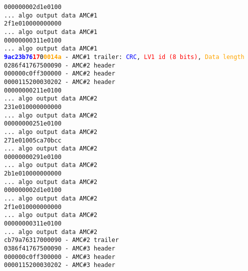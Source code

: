 \texttt{000000002d1e0100}\\
\texttt{... algo output data AMC\#1}\\
\texttt{2f1e010000000000}\\
\texttt{... algo output data AMC\#1}\\
\texttt{00000000311e0100}\\
\texttt{... algo output data AMC\#1}\\
\texttt{\textcolor{blue}{\textbf{9ac23b76}}\textcolor{red}{\textbf{17}}\textcolor{black}{0}\textcolor{orange}{\textbf{0014a}} - AMC\#1 trailer: \textcolor{blue}{CRC}, \textcolor{red}{LV1 id (8 bits)}, \textcolor{orange}{Data length}}\\
\texttt{0286f41767500090 - AMC\#2 header} \\
\texttt{000000c0ff300000 - AMC\#2 header} \\
\texttt{0000115200030202 - AMC\#2 header} \\
\texttt{00000000211e0100}\\
\texttt{... algo output data AMC\#2}\\
\texttt{231e010000000000}\\
\texttt{... algo output data AMC\#2}\\
\texttt{00000000251e0100}\\
\texttt{... algo output data AMC\#2}\\
\texttt{271e01005ca70bcc}\\
\texttt{... algo output data AMC\#2}\\
\texttt{00000000291e0100}\\
\texttt{... algo output data AMC\#2}\\
\texttt{2b1e010000000000}\\
\texttt{... algo output data AMC\#2}\\
\texttt{000000002d1e0100}\\
\texttt{... algo output data AMC\#2}\\
\texttt{2f1e010000000000}\\
\texttt{... algo output data AMC\#2}\\
\texttt{00000000311e0100}\\
\texttt{... algo output data AMC\#2}\\
\texttt{cb79a76317000090 - AMC\#2 trailer}\\
\texttt{0386f41767500090 - AMC\#3 header}\\
\texttt{000000c0ff300000 - AMC\#3 header}\\
\texttt{0000115200030202 - AMC\#3 header}\\
